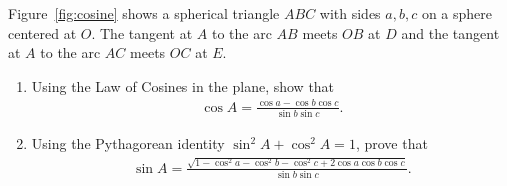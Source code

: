 \documentclass[12pt,a4paper]{memoir}
\theoremstyle{definition}
\begin{document}
	\begin{question}
		Figure~\ref{fig:cosine} shows a spherical triangle $ABC$ with sides $a,b,c$ on a sphere centered at $O$. The tangent at $A$ to the arc $AB$ meets $OB$ at $D$ and the tangent at $A$ to the arc $AC$ meets $OC$ at $E$.

		\begin{enumerate}
			\item  Using the Law of Cosines in the plane, show that
			\begin{align*}
				\displaystyle \cos A = \frac{\cos a - \cos b \cos c}{\sin b \sin c}.
			\end{align*}
			\item Using the Pythagorean identity $\sin^2 A + \cos^2 A = 1$, prove that
			\begin{align*}
				\displaystyle \sin A = \frac{\sqrt{1-\cos^2 a - \cos^2 b - \cos^2 c + 2\cos a \cos b \cos c}}{\sin b \sin c}.
			\end{align*}
		\end{enumerate}
	\end{question}
\end{document}

